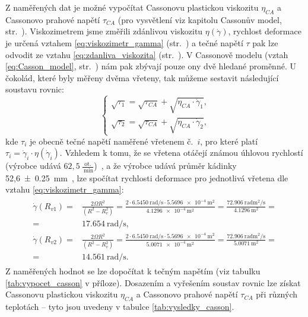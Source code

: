 \documentclass[12pt]{article}
\begin{document}
Z naměřených dat je možné vypočítat Cassonovu plastickou viskozitu $\eta_{CA}$ a Cassonovo prahové napětí $\tau_{CA}$ (pro vysvětlení viz kapitolu Cassonův model, str.~\pageref{sec:Casson}). Viskozimetrem jsme změřili zdánlivou viskozitu $\eta(\dot\gamma)$, rychlost deformace je určená vztahem \ref{eq:viskozimetr_gamma} (str.~\pageref{eq:viskozimetr_gamma}) a tečné napětí $\tau$ pak lze odvodit ze vztahu \ref{eq:zdanliva_viskozita} (str.~\pageref{eq:zdanliva_viskozita}). V Cassonově modelu (vztah \ref{eq:Casson_model}, str.~\pageref{eq:Casson_model}) nám pak zbývají pouze ony dvě hledané proměnné. U čokolád, které byly měřeny dvěma vřeteny, tak můžeme sestavit následující soustavu rovnic:
\begin{equation}
    \begin{cases}
        \sqrt{\tau_1} = \sqrt{\tau_{CA}} + \sqrt{\eta_{CA}\cdot\dot\gamma_1}\text{,}\\
        \sqrt{\tau_2} = \sqrt{\tau_{CA}} + \sqrt{\eta_{CA}\cdot\dot\gamma_2}\text{,}
    \end{cases}
\end{equation}
kde $\tau_i$ je obecně tečné napětí naměřené vřetenem č.~$i$, pro které platí $\tau_i = \dot\gamma_i\cdot\eta(\dot\gamma_i)$. Vzhledem k tomu, že se vřetena otáčejí známou úhlovou rychlostí (výrobce udává $62,5\:\frac{\text{ot.}}{\SI{}{\minute}}$)~\cite{man:VT-02}, a že výrobce udává průměr kádinky 52,6\SI{\pm 0,25}{\milli\metre}~\cite{man:VT-02}, lze spočítat rychlosti deformace pro jednotlivá vřetena dle vztahu \ref{eq:viskozimetr_gamma}:
\begin{align}
    \begin{split}
        \dot\gamma(R_{v1}) =& \frac{2\Omega R^2}{(R^2-R_v^2)} = \frac{2\cdot\SI{6,5450}{\radian\per\second}\cdot\SI{5,5696e-4}{\metre\squared}}{\SI{4,1296e-4}{\metre\squared}} = \frac{\SI{72,906}{\radian\metre\squared\per\second}}{\SI{4,1296}{\metre\squared}} =\\ =& \SI{17,654}{\radian\per\second}\text{,}\\
        \dot\gamma(R_{v2}) =& \frac{2\Omega R^2}{(R^2-R_v^2)} = \frac{2\cdot\SI{6,5450}{\radian\per\second}\cdot\SI{5,5696e-4}{\metre\squared}}{\SI{5,0071e-4}{\metre\squared}} = \frac{\SI{72,906}{\radian\metre\squared\per\second}}{\SI{5,0071}{\metre\squared}} =\\ =& \SI{14,561}{\radian\per\second}\text{.}
    \end{split}
\end{align}
Z naměřených hodnot se lze dopočítat k tečným napětím (viz tabulku \ref{tab:vypocet_casson} v příloze). Dosazením a vyřešením soustav rovnic lze získat Cassonovu plastickou viskozitu $\eta_{CA}$ a Cassonovo prahové napětí $\tau_{CA}$ při různých teplotách -- tyto jsou uvedeny v tabulce \ref{tab:vysledky_casson}.
\end{document}
